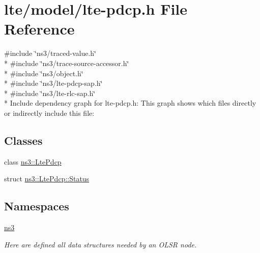 \hypertarget{lte-pdcp_8h}{}\section{lte/model/lte-\/pdcp.h File Reference}
\label{lte-pdcp_8h}
{\ttfamily \#include \char`\"{}ns3/traced-\/value.\+h\char`\"{}}\\*
{\ttfamily \#include \char`\"{}ns3/trace-\/source-\/accessor.\+h\char`\"{}}\\*
{\ttfamily \#include \char`\"{}ns3/object.\+h\char`\"{}}\\*
{\ttfamily \#include \char`\"{}ns3/lte-\/pdcp-\/sap.\+h\char`\"{}}\\*
{\ttfamily \#include \char`\"{}ns3/lte-\/rlc-\/sap.\+h\char`\"{}}\\*
Include dependency graph for lte-\/pdcp.h\+:
This graph shows which files directly or indirectly include this file\+:
\subsection*{Classes}
\begin{DoxyCompactItemize}
\item 
class \hyperlink{classns3_1_1LtePdcp}{ns3\+::\+Lte\+Pdcp}
\item 
struct \hyperlink{structns3_1_1LtePdcp_1_1Status}{ns3\+::\+Lte\+Pdcp\+::\+Status}
\end{DoxyCompactItemize}
\subsection*{Namespaces}
\begin{DoxyCompactItemize}
\item 
 \hyperlink{namespacens3}{ns3}
\begin{DoxyCompactList}\small\item\em Here are defined all data structures needed by an O\+L\+SR node. \end{DoxyCompactList}\end{DoxyCompactItemize}
